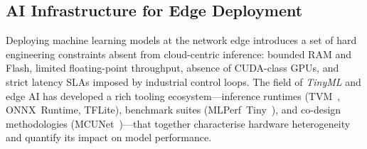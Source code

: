 %
%
%

\subsection{AI Infrastructure for Edge Deployment}
\label{subsec:edge-infra}

Deploying machine learning models at the network edge introduces a
set of hard engineering constraints absent from cloud-centric
inference: bounded RAM and Flash, limited floating-point throughput,
absence of CUDA-class GPUs, and strict latency SLAs imposed by
industrial control loops.
The field of \emph{TinyML} and edge AI has developed a rich tooling
ecosystem—inference runtimes (TVM~\cite{chen2018tvm},
ONNX~Runtime, TFLite), benchmark suites
(MLPerf~Tiny~\cite{banbury2021mlperftiny}), and co-design methodologies
(MCUNet~\cite{lin2020mcunet})—that together characterise hardware
heterogeneity and quantify its impact on model performance.

